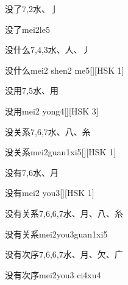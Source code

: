 \begin{entry}{没了}{7,2}{⽔、⼅}
  \begin{phonetics}{没了}{mei2le5}
  \end{phonetics}
\end{entry}

\begin{entry}{没什么}{7,4,3}{⽔、⼈、⼃}
  \begin{phonetics}{没什么}{mei2 shen2 me5}[][HSK 1]
  \end{phonetics}
\end{entry}

\begin{entry}{没用}{7,5}{⽔、⽤}
  \begin{phonetics}{没用}{mei2 yong4}[][HSK 3]
  \end{phonetics}
\end{entry}

\begin{entry}{没关系}{7,6,7}{⽔、⼋、⽷}
  \begin{phonetics}{没关系}{mei2guan1xi5}[][HSK 1]
  \end{phonetics}
\end{entry}

\begin{entry}{没有}{7,6}{⽔、⽉}
  \begin{phonetics}{没有}{mei2 you3}[][HSK 1]
  \end{phonetics}
\end{entry}

\begin{entry}{没有关系}{7,6,6,7}{⽔、⽉、⼋、⽷}
  \begin{phonetics}{没有关系}{mei2you3guan1xi5}
  \end{phonetics}
\end{entry}

\begin{entry}{没有次序}{7,6,6,7}{⽔、⽉、⽋、⼴}
  \begin{phonetics}{没有次序}{mei2you3 ci4xu4}
  \end{phonetics}
\end{entry}

